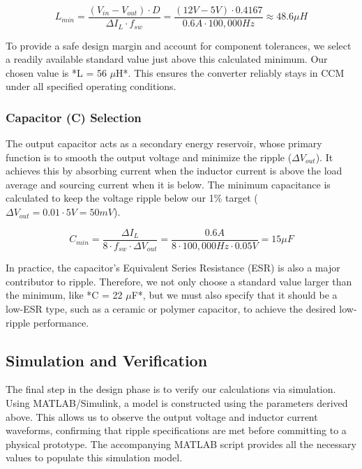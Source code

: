 \documentclass[12pt, a4paper]{article}
\begin{document}
\begin{equation}

L_{min} = \frac{(V_{in} - V_{out}) \cdot D}{ \Delta I_L \cdot f_{sw}} = \frac{(12V - 5V) \cdot 0.4167}{0.6A \cdot 100,000Hz} \approx 48.6 \mu H

\label{eq:inductor}

\end{equation}

To provide a safe design margin and account for component tolerances, we select a readily available standard value just above this calculated minimum. Our chosen value is *L = 56 $\mu$H*. This ensures the converter reliably stays in CCM under all specified operating conditions.



\subsubsection{Capacitor (C) Selection}

The output capacitor acts as a secondary energy reservoir, whose primary function is to smooth the output voltage and minimize the ripple ($\Delta V_{out}$). It achieves this by absorbing current when the inductor current is above the load average and sourcing current when it is below. The minimum capacitance is calculated to keep the voltage ripple below our 1\% target ($\Delta V_{out} = 0.01 \cdot 5V = 50mV$).

\begin{equation}

C_{min} = \frac{\Delta I_L}{8 \cdot f_{sw} \cdot \Delta V_{out}} = \frac{0.6A}{8 \cdot 100,000Hz \cdot 0.05V} = 15 \mu F

\label{eq:capacitor}

\end{equation}

In practice, the capacitor's Equivalent Series Resistance (ESR) is also a major contributor to ripple. Therefore, we not only choose a standard value larger than the minimum, like *C = 22 $\mu$F*, but we must also specify that it should be a low-ESR type, such as a ceramic or polymer capacitor, to achieve the desired low-ripple performance.



\subsection{Simulation and Verification}

The final step in the design phase is to verify our calculations via simulation. Using MATLAB/Simulink, a model is constructed using the parameters derived above. This allows us to observe the output voltage and inductor current waveforms, confirming that ripple specifications are met before committing to a physical prototype. The accompanying MATLAB script provides all the necessary values to populate this simulation model.
\end{document}
